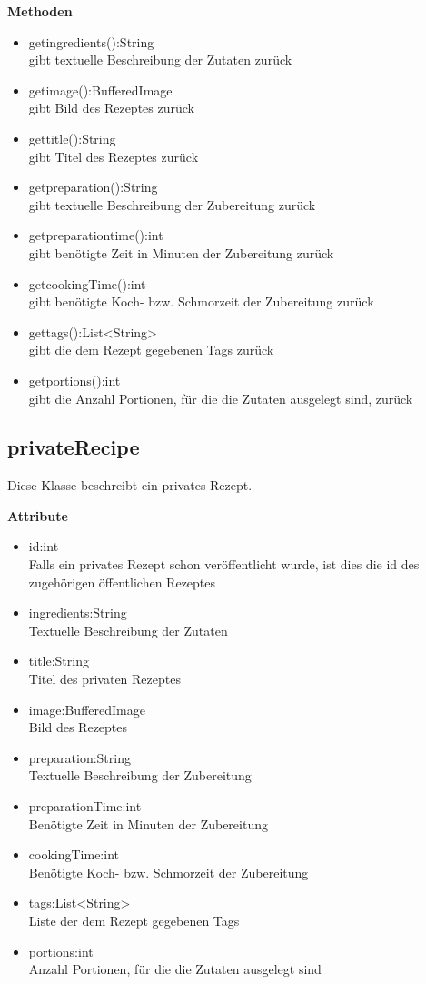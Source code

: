 \textbf{Methoden}
\begin{itemize}[nosep]
	\item getingredients():String \\ gibt textuelle Beschreibung der Zutaten zurück
	\item getimage():BufferedImage \\ gibt Bild des Rezeptes zurück
	\item gettitle():String \\ gibt Titel des Rezeptes zurück
	\item getpreparation():String \\ gibt textuelle Beschreibung der Zubereitung zurück
	\item getpreparationtime():int \\ gibt benötigte Zeit in Minuten der Zubereitung zurück
	\item getcookingTime():int \\ gibt benötigte Koch- bzw. Schmorzeit der Zubereitung zurück
	\item gettags():List<String> \\ gibt die dem Rezept gegebenen Tags zurück
	\item getportions():int \\ gibt die Anzahl Portionen, für die die Zutaten ausgelegt sind, zurück
\end{itemize}

\subsection{privateRecipe}
Diese Klasse beschreibt ein privates Rezept.

\textbf{Attribute}
\begin{itemize}[nosep]
	\item id:int \\ Falls ein privates Rezept schon veröffentlicht wurde, ist dies die id des zugehörigen öffentlichen Rezeptes
	\item ingredients:String \\ Textuelle Beschreibung der Zutaten
	\item title:String \\ Titel des privaten Rezeptes
	\item image:BufferedImage \\ Bild des Rezeptes
	\item preparation:String \\ Textuelle Beschreibung der Zubereitung
	\item preparationTime:int \\ Benötigte Zeit in Minuten der Zubereitung
	\item cookingTime:int \\ Benötigte Koch- bzw. Schmorzeit der Zubereitung
	\item tags:List<String> \\ Liste der dem Rezept gegebenen Tags
	\item portions:int \\ Anzahl Portionen, für die die Zutaten ausgelegt sind
\end{itemize}

